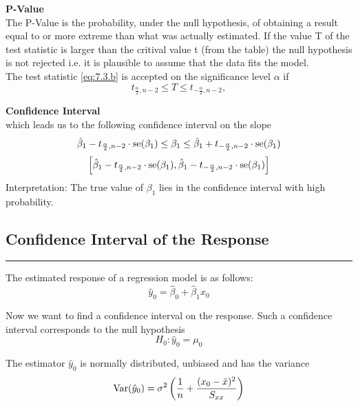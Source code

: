\textbf{P-Value}\\
The P-Value is the probability, under the null hypothesis, of obtaining a result equal to or more extreme than what was actually estimated. If the value T of the test statistic is larger than the critival value t (from the table) the null hypothesis is not rejected i.e. it is plausible to assume that the data fits the model.\\

The test statistic \ref{eq:7.3.b} is accepted on the significance level $\alpha$ if
\begin{equation}
  t_{\frac{\alpha}{2}, n-2} \leq T \leq t_{-\frac{\alpha}{2}, n-2},
\end{equation}

\textbf{Confidence Interval}\\
which leads us to the following confidence interval on the slope
\begin{equation}
  \hat{\beta}_1 - t_{\frac{\alpha}{2}, n-2} \cdot \textup{se}(\beta_1)
  \leq \beta_1 \leq
  \hat{\beta}_1 + t_{-\frac{\alpha}{2}, n-2} \cdot \textup{se}(\beta_1)
\end{equation}
\begin{equation}
  \left[
  \hat{\beta}_1 - t_{\frac{\alpha}{2}, n-2} \cdot \textup{se}(\beta_1),
  \hat{\beta}_1 - t_{-\frac{\alpha}{2}, n-2} \cdot \textup{se}(\beta_1)\right]
\end{equation}
Interpretation: The true value of $\beta_1$ lies in the confidence interval with high probability.

\subsection{Confidence Interval of the Response}
\noindent\rule[\linienAbstand]{\linewidth}{\linienDicke}
The estimated response of a regression model is as follows:
\begin{equation}
  \hat{y}_0 = \hat{\beta}_0 +  \hat{\beta}_1 x_0
\end{equation}

Now we want to find a confidence interval on the response. Such a confidence interval corresponds to the null hypothesis
\begin{equation}
  H_0: \hat{y}_0 = \mu_0
\end{equation}

The estimator $\hat{y}_0$ is normally distributed, unbiased and has the variance
\begin{equation}
  \textup{Var}(\hat{y}_0) = \sigma^2\left(\frac{1}{n} + \frac{(x_0 - \bar{x})^2}{S_{xx}}\right)
\end{equation}

